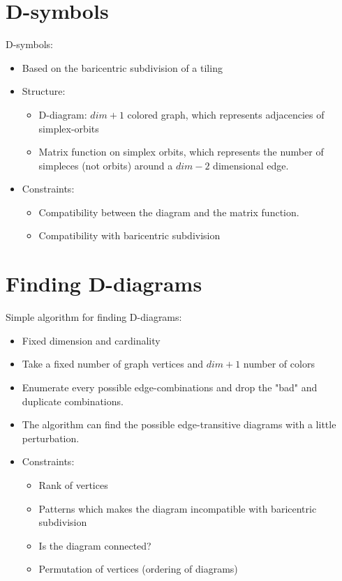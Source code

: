 \section{D-symbols}
\begin{frame}
  D-symbols:
  \begin{itemize}
    \item Based on the baricentric subdivision of a tiling
    \item Structure:
      \begin{itemize}
	\item D-diagram: $dim+1$ colored graph, which represents adjacencies of
	  simplex-orbits
	\item Matrix function on simplex orbits, which represents the number of
	  simpleces (not orbits) around a $dim-2$ dimensional edge.
      \end{itemize}
    \item Constraints:
      \begin{itemize}
	\item Compatibility between the diagram and the matrix function.
	\item Compatibility with baricentric subdivision
      \end{itemize}
  \end{itemize}
\end{frame}

\section{Finding D-diagrams}
\begin{frame}
  Simple algorithm for finding D-diagrams:
  \begin{itemize}
    \item Fixed dimension and cardinality
    \item Take a fixed number of graph vertices and $dim+1$ number of colors
    \item Enumerate every possible edge-combinations and drop the "bad" and
      duplicate combinations.
    \item The algorithm can find the possible edge-transitive diagrams with a
      little perturbation.
    \item Constraints:
      \begin{itemize}
	\item Rank of vertices
	\item Patterns which makes the diagram incompatible with baricentric
	  subdivision
	\item Is the diagram connected?
	\item Permutation of vertices (ordering of diagrams)
      \end{itemize}
  \end{itemize}
\end{frame}

